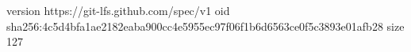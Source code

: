 version https://git-lfs.github.com/spec/v1
oid sha256:4c5d4bfa1ae2182eaba900cc4e5955ec97f06f1b6d6563ce0f5c3893e01afb28
size 127
